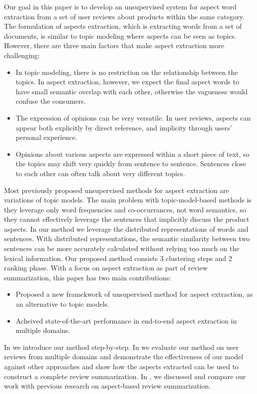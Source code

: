 Our goal in this paper is to develop an unsupervised system 
for aspect word extraction from a set of user reviews about products within 
the same category.  The formulation of aspects extraction, 
which is extracting words from a set of documents, 
is similar to topic modeling where aspects can be seen as topics. 
However, there are three main factors that make aspect extraction 
more challenging:
\begin{itemize}
    \item In topic modeling, there is no restriction on the relationship 
between the topics. In aspect extraction, however, we expect the final 
	aspect words to have small semantic overlap with each other, 
	otherwise the vagueness would confuse the consumers.
    \item The expression of opinions can be very versatile. 
          In user reviews, aspects can appear both explicitly by 
	direct reference, and implicity through users' personal experience.
    \item Opinions about various aspects are expressed within a short 
          piece of text, so the topics may shift very quickly from 
          sentence to sentence.
          Sentences close to each other can often 
          talk about very different topics.
\end{itemize}
Most previously proposed unsupervised methods for aspect extraction are 
variations of topic models. The main problem with topic-model-based methods 
is they leverage only word frequencies and co-occurrances, not word semantics, 
so they cannot effectively leverage the sentences that implicitly discuss 
the product aspects. In our method we leverage the distributed 
representations of words and sentences. With distributed representations, 
the semantic similarity between two sentences can be more accurately 
calculated without relying too much on the lexical information.
Our proposed method consists 3 clustering steps and
2 ranking phase. With a focus on aspect extraction as part of 
review summarization, this paper has two main contributions:

\begin{itemize}
    \item Proposed a new framekwork of unsupervised method for aspect extraction, as an alternative to topic models.
    \item Acheived state-of-the-art performance in end-to-end aspect extraction in multiple domains.
\end{itemize}

In  we introduce our method step-by-step.
In  
we evaluate our method on user reviews from multiple domains and demonstrate 
the effectiveness of our model against other approaches 
and show how the aspects extracted can be used
to construct a complete review summarization. 
In , we discussed
and compare our work with previous research on aspect-based review 
summarization.

